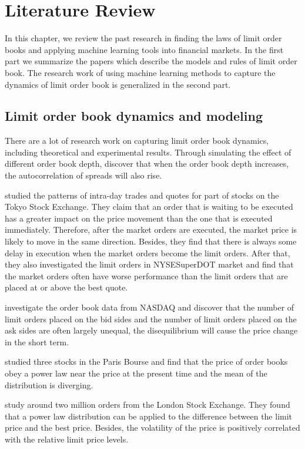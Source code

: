 \chapter{Literature Review}
In this chapter, we review the past research in finding the laws of limit order books and applying machine learning tools into financial markets. In the first part we summarize the papers which describe the models and rules of limit order book. The research work of using machine learning methods to capture the dynamics of limit order book is generalized in the second part. 

\section{Limit order book dynamics and modeling}
There are a lot of research work on capturing limit order book dynamics, including theoretical and experimental results. Through simulating the effect of different order book depth,\cite{bollerslev1993trading} discover that when the order book depth increases, the autocorrelation of spreads will also rise.

\cite{hamao1995securities} studied the patterns of intra-day trades and quotes for part of stocks on the Tokyo Stock Exchange.  They claim that an order that is waiting to be executed has a greater impact on the price movement than the one that is executed immediately. Therefore, after the market orders are executed, the market price is likely to move in the same direction. Besides, they find that there is always some delay in execution when the market orders become the limit orders.  After that, they also investigated the limit orders in NYSESuperDOT market and find that the market orders often have worse performance than the limit orders that are placed at or above the best quote.   

\cite{maslov2001price} investigate the order book data from NASDAQ and discover that the number of limit orders placed on the bid sides and the number of limit orders placed on the ask sides are often largely unequal, the disequilibrium will cause the price change in the short term.  

\cite{bouchaud2002statistical} studied three stocks in the Paris Bourse and find that the price of order books obey a power law near the price at the present time and the mean of the distribution is diverging.  

\cite{zovko2002power} study around two million orders from the London Stock Exchange. They found that a power law distribution can be applied to the difference between the limit price and the best price. Besides, the volatility of the price is positively correlated with the relative limit price levels. 

